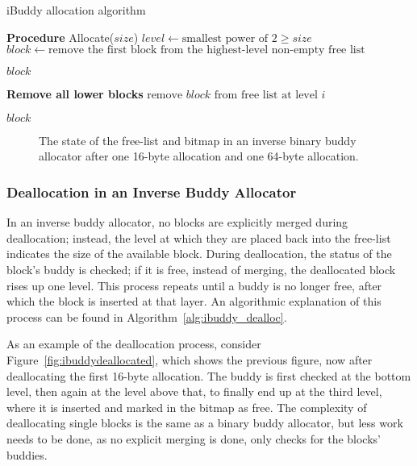\begin{algorithm}[h]
    \caption{iBuddy allocation algorithm}
    \label{alg:ibuddy_alloc}
    \begin{algorithmic}[1]
        \Statex \textbf{Procedure} Allocate($size$)
        \State $level \gets \text{smallest power of 2} \geq size$
        \State $block \gets \text{remove the first block from the highest-level non-empty free list}$

        \State \Return $block$
        \State \Return {}
        \EndIf

        \Statex \textbf{Remove all lower blocks}
        \State $\text{remove } block \text{ from free list at level } i$
        \EndFor
        \EndFor

        \State \Return $block$
    \end{algorithmic}
\end{algorithm}

\begin{figure}[h]
    \centering
    
    \caption{The state of the free-list and bitmap in an inverse binary buddy allocator after one
        16-byte allocation and one 64-byte allocation.}
    \label{fig:ibuddyallocated2}
\end{figure}

\FloatBarrier

\subsubsection{Deallocation in an Inverse Buddy Allocator}
In an inverse buddy allocator, no blocks are explicitly merged during deallocation; instead, the level at which they are placed back into the free-list indicates the size of the available block. During deallocation, the status of the block's buddy is checked; if it is free, instead of merging, the deallocated block rises up one level. This process repeats until a buddy is no longer free, after which the block is inserted at that layer. An algorithmic explanation of this process can be found in Algorithm~\ref{alg:ibuddy_dealloc}.

As an example of the deallocation process, consider Figure~\ref{fig:ibuddydeallocated}, which shows the previous figure, now after deallocating the first 16-byte allocation. The buddy is first checked at the bottom level, then again at the level above that, to finally end up at the third level, where it is inserted and marked in the bitmap as free. The complexity of deallocating single blocks is the same as a binary buddy allocator, but less work needs to be done, as no explicit merging is done, only checks for the blocks' buddies.

